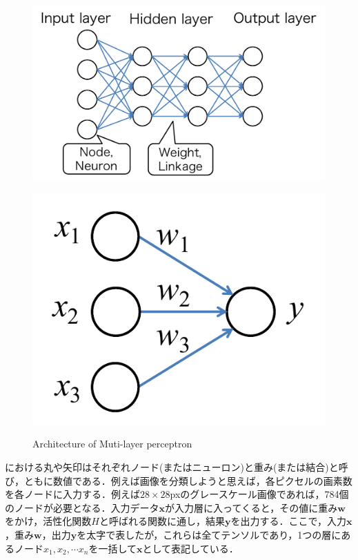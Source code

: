 \begin{figure}[H]
	\centering
	\begin{minipage}[b]{0.4\columnwidth}
		\centering
		\includegraphics[width=1.2\linewidth]{figure/chapter2/MLP}
		\label{fig:mlp}
	\end{minipage}
	\begin{minipage}[b]{0.4\columnwidth}
		\centering
		\includegraphics[width=0.7\linewidth]{figure/chapter2/simple_perceptron}
		\label{fig:perceptron}
	\end{minipage}
	\caption{Architecture of Muti-layer perceptron}
\end{figure}

における丸や矢印はそれぞれノード(またはニューロン)と重み(または結合)と呼び，ともに数値である．例えば画像を分類しようと思えば，各ピクセルの画素数を各ノードに入力する．例えば$28 \times 28$pxのグレースケール画像であれば，784個のノードが必要となる．入力データ$\bm {x}$が入力層に入ってくると，その値に重み$\bm {w}$をかけ，活性化関数$H$と呼ばれる関数に通し，結果$\bm{y}$を出力する．ここで，入力$\bm{x}$，重み$\bm{w}$，出力$\bm{y}$を太字で表したが，これらは全てテンソルであり，1つの層にあるノード$x_1, x_2, \cdots x_n$を一括して$\bm {x}$として表記している．


